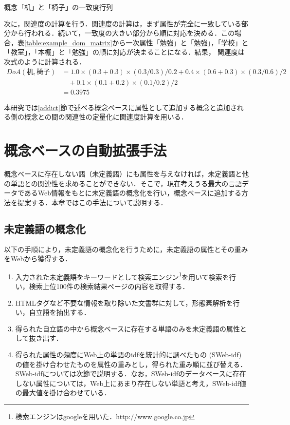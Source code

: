 \documentclass[japanese]{jnlp_1.4}
\begin{document}
\begin{table}[b]
\caption{概念「机」と「椅子」の一致度行列}
\label{table:example_dom_matrix}

\end{table}

次に，関連度の計算を行う．関連度の計算は，まず属性が完全に一致している部分から行われる．続いて，一致度の大きい部分から順に対応を決める．この場合，表\ref{table:example_dom_matrix}から一次属性「勉強」と「勉強」，「学校」と「教室」，「本棚」と「勉強」の順に対応が決まることになる．結果，
関連度は次式のように計算される．
\begin{align*}
DoA(机,椅子)	& =1.0\times(0.3+0.3)\times(0.3/0.3)/0.2+0.4\times(0.6+0.3)\times(0.3/0.6)/2	\\
		& \quad	+0.1\times(0.1+0.2)\times(0.1/0.2)/2	\\
		& =0.3975
\end{align*}

本研究では\ref{addict}節で述べる概念ベースに属性として追加する概念と追加される側の概念との間の関連性の定量化に関連度計算を用いる．


\section{概念ベースの自動拡張手法}
\label{concept base auto expand}

概念ベースに存在しない語（未定義語）にも属性を与えなければ，未定義語と他の単語との関連性を求めることができない．そこで，現在考えうる最大の言語データであるWeb情報をもとに未定義語の概念化を行い，概念ベースに追加する方法を提案する．本章ではこの手法について説明する．


\subsection{未定義語の概念化}
\label{acquiring_attribute_of_unknown_word}

以下の手順により，未定義語の概念化を行うために，未定義語の属性とその重みをWebから獲得する．

\begin{enumerate}

\item 入力された未定義語をキーワードとして検索エンジン\footnote{検索エンジンはgoogleを用いた．http://www.google.co.jp}を用いて検索を行い，検索上位100件の検索結果ページの内容を取得する．

\item HTMLタグなど不要な情報を取り除いた文書群に対して，形態素解析を行い，自立語を抽出する．

\item 得られた自立語の中から概念ベースに存在する単語のみを未定義語の属性として抜き出す．

\item 得られた属性の頻度にWeb上の単語のidfを統計的に調べたもの (SWeb-idf) \cite{tuji:04}の値を掛け合わせたものを属性の重みとし，得られた重み順に並び替える．SWeb-idfについては次節で説明する．なお，SWeb-idfのデータベースに存在しない属性については，Web上にあまり存在しない単語と考え，SWeb-idf値の最大値を掛け合わせている．

\end{enumerate}
\end{document}
